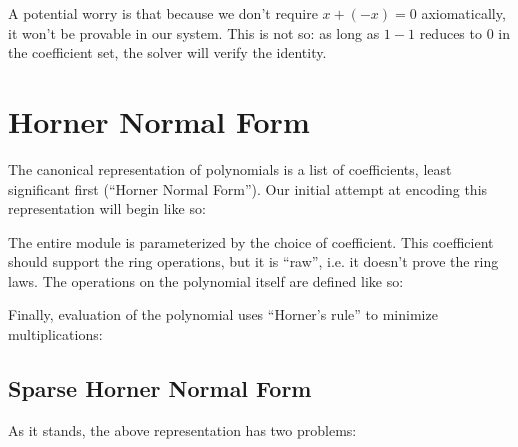 \documentclass[draft, twocolumn]{article}
\theoremstyle{definition}
\begin{document}
A potential worry is that because we don't require \(x + (-x) = 0\)
axiomatically, it won't be provable in our system. This is not so: as long as
\(1 - 1\) reduces to \(0\) in the coefficient set, the solver will verify the
identity.
\section{Horner Normal Form}
The canonical representation of polynomials is a list of coefficients, least
significant first (``Horner Normal Form''). Our initial attempt at encoding this
representation will begin like so:

The entire module is parameterized by the choice of coefficient. This
coefficient should support the ring operations, but it is ``raw'', i.e. it
doesn't prove the ring laws. The operations on the polynomial itself are defined
like so\footnotemark:

Finally, evaluation of the polynomial uses ``Horner's rule'' to minimize
multiplications:
\subsection{Sparse Horner Normal Form}
As it stands, the above representation has two problems:
\end{document}
